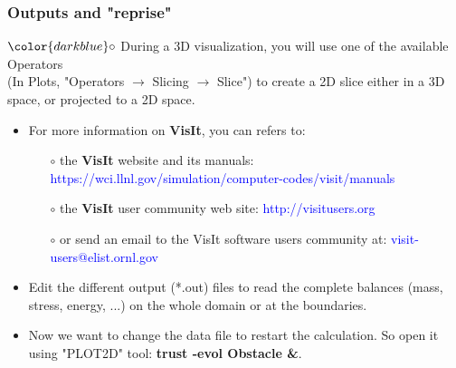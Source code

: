 \documentclass[10pt, hyperref={unicode=true,pdfusetitle, bookmarks=true,bookmarksnumbered=false,bookmarksopen=false, breaklinks=false,pdfborder={0 0 1},backref=true,colorlinks=true,linkcolor=darkblue,pageanchor}]{beamer}
\begin{document}
\begin{frame}
\frametitle{Outputs and "reprise"}
\begin{block}{}

\hspace{1cm} $\color{darkblue}\circ$ {\small{During a 3D visualization, you will use one of the available Operators \\
\hspace{1.3cm} (In Plots, "Operators $\rightarrow$ Slicing $\rightarrow$ Slice") to create a 2D slice either in a 3D \\
\hspace{1.3cm} space, or projected to a 2D space.}}

\begin{itemize}
\item For more information on \textbf{VisIt}, you can refers to: 
    \begin{itemize}
    \item [$\circ$] the \textbf{VisIt} website and its manuals: \textcolor{blue}{https://wci.llnl.gov/simulation/computer-codes/visit/manuals}
    \item [$\circ$] the \textbf{VisIt} user community web site: \textcolor{blue}{http://visitusers.org}
    \item [$\circ$] or send an email to the VisIt software users community at: \textcolor{blue}{visit-users@elist.ornl.gov}
    \end{itemize}

\item Edit the different output (*.out) files to read the complete balances (mass, stress, energy, ...) on the whole domain or at the boundaries.

\item Now we want to change the data file to restart the calculation. So open it using "PLOT2D" tool: \textbf{trust -evol Obstacle \&}.
\end{itemize}

\end{block}
\end{frame}
\end{document}
